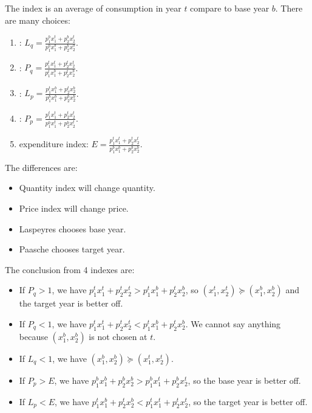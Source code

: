 \begin{example}[index]
    The index is an average of consumption in year $t$ compare to base year $b$. There are many choices:
    \begin{enumerate}
        \item {}: $\displaystyle L_q = \frac{p_1^b x_1^t + p_2^b x_2^t}{p_1^b x_1^b + p_2^b x_2^b}$.
        \item {}: $\displaystyle P_q = \frac{p_1^t x_1^t + p_2^t x_2^t}{p_1^t x_1^b + p_2^t x_2^b}$.
        \item {}: $\displaystyle L_p = \frac{p_1^t x_1^b + p_2^t x_2^b}{p_1^b x_1^b + p_2^b x_2^b}$.
        \item {}: $\displaystyle P_p = \frac{p_1^t x_1^t + p_2^t x_2^t}{p_1^b x_1^t + p_2^b x_2^t}$.
        \item expenditure index: $\displaystyle E = \frac{p_1^t x_1^t + p_2^t x_2^t}{p_1^b x_1^b + p_2^b x_2^b}$.
    \end{enumerate}    
\end{example}

The differences are:
\begin{itemize}
    \item Quantity index will change quantity.
    \item Price index will change price.
    \item Laspeyres chooses base year.
    \item Paasche chooses target year.
\end{itemize}

The conclusion from 4 indexes are:
\begin{itemize}
    \item If $P_q > 1$, we have $p_1^t x_1^t + p_2^t x_2^t > p_1^t x_1^b + p_2^t x_2^b$, so $(x_1^t,x_2^t) \succeq (x_1^b,x_2^b)$ and the target year is better off.
    \item If $P_q < 1$, we have $p_1^t x_1^t + p_2^t x_2^t < p_1^t x_1^b + p_2^t x_2^b$. We cannot say anything because $(x_1^b,x_2^b)$ is not chosen at $t$.
    \item If $L_q < 1$, we have $(x_1^b,x_2^b) \succeq (x_1^t,x_2^t)$.
    \item If $P_p > E$, we have $p_1^b x_1^b + p_2^b x_2^b > p_1^b x_1^t + p_2^b x_2^t$, so the base year is better off.
    \item If $L_p < E$, we have $p_1^t x_1^b + p_2^t x_2^b < p_1^t x_1^t + p_2^t x_2^t$, so the target year is better off.
\end{itemize}

